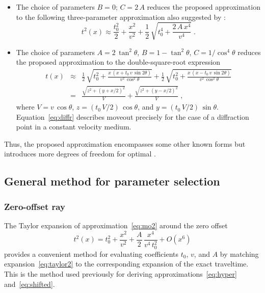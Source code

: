 \begin{itemize}
\item The choice of parameters $B=0$; $C=2\,A$ reduces the proposed approximation to the following 
  three-parameter approximation also suggested by \cite{blias}:
  \begin{equation}
    \label{eq:blias2}
    t^2(x) \approx \frac{t_0^2}{2} + \frac{x^2}{v^2} + \frac{1}{2}\,\sqrt{t_0^4 + \frac{2\,A\,x^4}{v^4}}\;.
  \end{equation}
  
\item The choice of parameters $A = 2\,\tan^2{\theta}$,
  $B=1-\tan^2{\theta}$, $C=1/\cos^4{\theta}$ reduces the proposed
  approximation to the double-square-root expression 
  \begin{eqnarray}
    \nonumber
    t(x) & \approx & \frac{1}{2}\,
    \sqrt{t_0^2 + \frac{x\,(x+t_0\,v\,\sin{2\theta})}{v^2\,\cos^2{\theta}}} +
    \frac{1}{2}\,
    \sqrt{t_0^2 + \frac{x\,(x-t_0\,v\,\sin{2\theta})}{v^2\,\cos^2{\theta}}} \\
    & = & \frac{\sqrt{z^2 + (y+x/2)^2}}{V} + \frac{\sqrt{z^2 + (y-x/2)^2}}{V}\;,
    \label{eq:diffr}
  \end{eqnarray}
  where $V = v\,\cos{\theta}$, $z=(t_0\,V/2)\,\cos{\theta}$, and
  $y=(t_0\,V/2)\,\sin{\theta}$. Equation~\ref{eq:diffr} describes
  moveout precisely for the case of a diffraction point in a constant
  velocity medium.
\end{itemize}

Thus, the proposed approximation encompasses some other known forms but
introduces more degrees of freedom for  optimal  .

\subsection{General method for parameter selection}
\subsubsection{Zero-offset ray}

The Taylor expansion of approximation~\ref{eq:mo2} around the zero offset
\begin{equation}
  \label{eq:taylor2}
  t^2(x) = t_0^2 + \frac{x^2}{v^2} + \frac{A}{2}\,\frac{x^4}{v^4\,t_0^2} + O(x^6)
\end{equation}
provides a convenient method for evaluating coefficients $t_0$, $v$,
and $A$ by matching expansion~\ref{eq:taylor2} to the corresponding
expansion of the exact traveltime. This is the method used previously
for deriving approximations~\ref{eq:hyper} and~\ref{eq:shifted}. 

